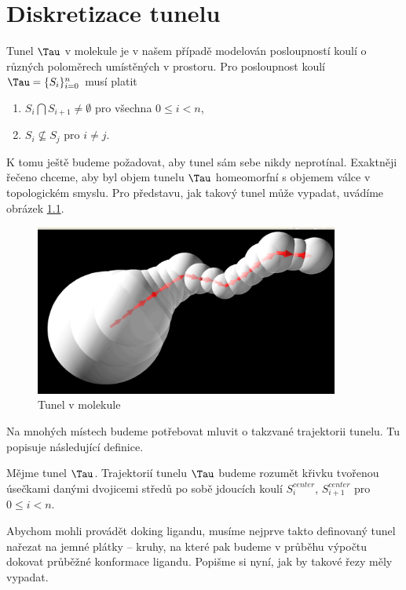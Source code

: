 \chapter{Diskretizace tunelu}

Tunel $ \Tau $ v molekule je v našem případě modelován posloupností koulí o různých
poloměrech umístěných v prostoru. Pro posloupnost koulí $ \Tau = \{S_i\}_{i=0}^{n} $
musí platit

    \begin{enumerate}[label={(\arabic*)}]
        \item $ S_i \bigcap S_{i+1} \neq \emptyset $ pro všechna $ 0 \leq i < n$,
        \item $ S_i \nsubseteq S_j$  pro $ i \neq j $.
    \end{enumerate}

K tomu ještě budeme požadovat, aby tunel sám sebe nikdy neprotínal. Exaktněji řečeno
chceme, aby byl objem tunelu $ \Tau $ homeomorfní s objemem válce v topologickém smyslu.
Pro představu, jak takový tunel může vypadat, uvádíme obrázek \ref{fig:basic_tunnel}.
\begin{figure}[ht]
    \centering
    \includegraphics[width=100mm]{img/basic_tunnel.jpg}
    \caption{Tunel v molekule}
  \centering
  \label{fig:basic_tunnel}
\end{figure}

Na mnohých místech budeme potřebovat mluvit o takzvané trajektorii tunelu. Tu popisuje
následující definice.

\begin{defi}
Mějme tunel $ \Tau $. Trajektorií tunelu $ \Tau $ budeme rozumět křivku tvořenou
úsečkami danými dvojicemi středů po sobě jdoucích koulí $ S_i^{center} $,
$ S_{i+1}^{center} $ pro $ 0 \leq i < n$.
\end{defi}

Abychom mohli provádět doking ligandu, musíme nejprve takto definovaný tunel nařezat na
jemné plátky – kruhy, na které pak budeme v průběhu výpočtu dokovat průběžné konformace ligandu.
Popišme si nyní, jak by takové řezy měly vypadat.

